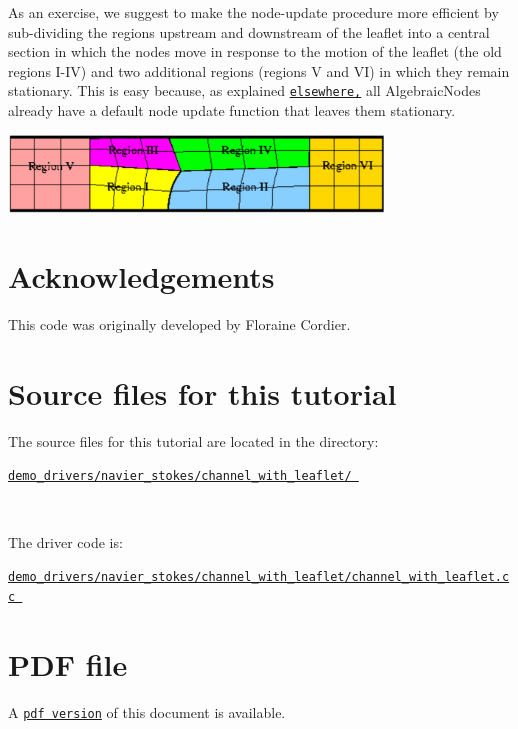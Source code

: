 As an exercise, we suggest to make the node-\/update procedure more efficient by sub-\/dividing the regions upstream and downstream of the leaflet into a central section in which the nodes move in response to the motion of the leaflet (the old regions I-\/\+IV) and two additional regions (regions V and VI) in which they remain stationary. This is easy because, as explained \href{../../algebraic_collapsible_channel/html/index.html#comm}{\tt elsewhere,} all {\ttfamily Algebraic\+Nodes} already have a default node update function that leaves them stationary.

 
\begin{DoxyImage}
\includegraphics[width=0.75\textwidth]{channel_with_leaflet_better_mesh}
\end{DoxyImage}




 

\hypertarget{index_ackn}{}\section{Acknowledgements}\label{index_ackn}

\begin{DoxyItemize}
\item This code was originally developed by Floraine Cordier.
\end{DoxyItemize}



 

\hypertarget{index_sources}{}\section{Source files for this tutorial}\label{index_sources}

\begin{DoxyItemize}
\item The source files for this tutorial are located in the directory\+:~\newline
~\newline
\begin{center} \href{
../../../../
demo_drivers/navier_stokes/channel_with_leaflet/
}{\tt demo\+\_\+drivers/navier\+\_\+stokes/channel\+\_\+with\+\_\+leaflet/ } \end{center} ~\newline

\item The driver code is\+: ~\newline
~\newline
\begin{center} \href{
../../../../
demo_drivers/navier_stokes/channel_with_leaflet/channel_with_leaflet.cc
}{\tt demo\+\_\+drivers/navier\+\_\+stokes/channel\+\_\+with\+\_\+leaflet/channel\+\_\+with\+\_\+leaflet.\+cc } \end{center} 
\end{DoxyItemize}

 

 \hypertarget{index_pdf}{}\section{P\+D\+F file}\label{index_pdf}
A \href{../latex/refman.pdf}{\tt pdf version} of this document is available. 
